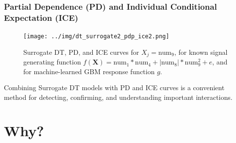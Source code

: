 \documentclass[11pt,aspectratio=169,hyperref={colorlinks}]{beamer}
\begin{document}
	\begin{frame}[t]
		
		\frametitle{Partial Dependence (PD) and Individual Conditional Expectation (ICE)}
		
		\vspace{-20pt}
		
		\begin{figure}[htb]
			\begin{center}
				\label{fig:dt_surrogate_pdp_ice}
				\texttt{[image: ../img/dt\_surrogate2\_pdp\_ice2.png]}
				\caption{Surrogate DT, PD, and ICE curves for $ X_j = \text{num}_9$, for known signal generating function $f(\mathbf{X}) = \text{num} _1 * \text{num}_4 + |\text{num}_8| * \text{num}_9^2 + e$, and for machine-learned GBM response function $g$.}
			\end{center}
		\end{figure}
		
		Combining Surrogate DT models with PD and ICE curves is a convenient method for detecting, confirming, and understanding important interactions. 
		
	\end{frame}

	\section{Why?}
	
	\subsection*{} %
\end{document}
